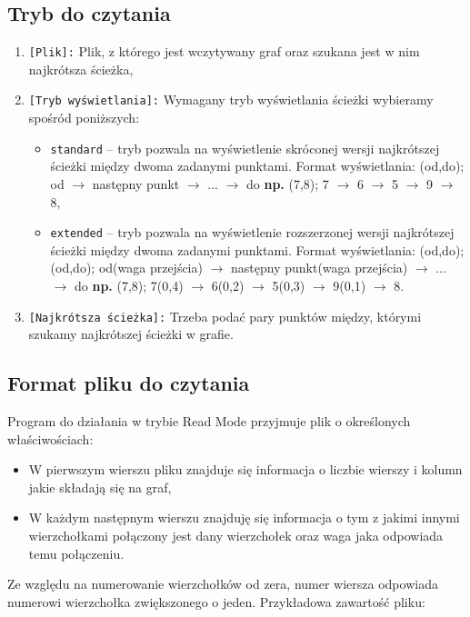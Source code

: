 \documentclass[10pt, a4paper]{report}
\begin{document}
    \subsection{Tryb do czytania}
    \begin{enumerate}
      \item \texttt{[Plik]:}
      \newline Plik, z którego jest wczytywany graf oraz szukana jest w nim najkrótsza ścieżka,

      \item \texttt{[Tryb wyświetlania]:}
      \newline Wymagany tryb wyświetlania ścieżki wybieramy spośród poniższych:
      \begin{itemize}
          \item \texttt{standard} – tryb pozwala na wyświetlenie skróconej wersji najkrótszej ścieżki między dwoma zadanymi punktami.
          \newline Format wyświetlania: (od,do); od $\rightarrow$ następny punkt $\rightarrow$ ... $\rightarrow$ do
          \newline \textbf{np.}
          \newline(7,8); 7 $\rightarrow$ 6 $\rightarrow$ 5 $\rightarrow$ 9 $\rightarrow$ 8,
          \item \texttt{extended} -- tryb pozwala na wyświetlenie rozszerzonej wersji najkrótszej ścieżki między dwoma zadanymi punktami.
          \newline Format wyświetlania: (od,do); (od,do); od(waga przejścia) $\rightarrow$ następny punkt(waga przejścia) $\rightarrow$ ... $\rightarrow$ do
          \newline \textbf{np.}
          \newline (7,8); 7(0,4) $\rightarrow$ 6(0,2) $\rightarrow$ 5(0,3) $\rightarrow$ 9(0,1) $\rightarrow$ 8.
    \end{itemize}
      \item \texttt{[Najkrótsza ścieżka]:}
      \newline Trzeba podać pary punktów między, którymi szukamy najkrótszej ścieżki w grafie.
    \end{enumerate}

    \subsection{Format pliku do czytania}
    Program do działania w trybie Read Mode przyjmuje plik o określonych właściwościach:
    \begin{itemize}
        \item W pierwszym wierszu pliku znajduje się informacja o liczbie wierszy i kolumn jakie składają się na graf,
        \item W każdym następnym wierszu znajduję się informacja o tym z jakimi innymi wierzchołkami połączony jest dany wierzchołek oraz waga jaka odpowiada temu połączeniu.
    \end{itemize}
    Ze względu na numerowanie wierzchołków od zera, numer wiersza odpowiada numerowi wierzchołka zwiększonego o jeden. 
    \newpage
    Przykładowa zawartość pliku:
    
\end{document}
